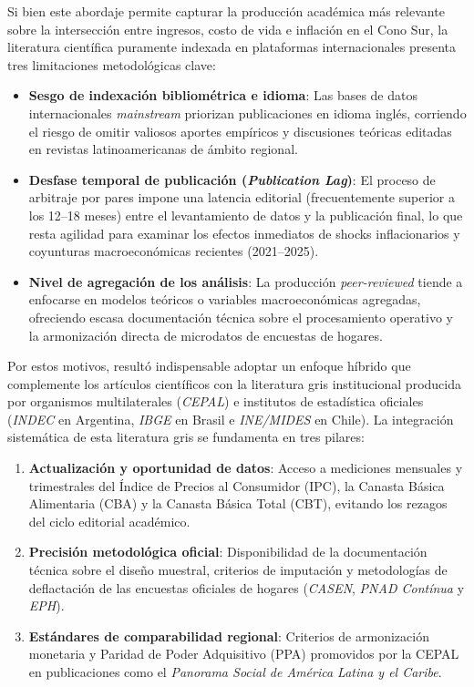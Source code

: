 Si bien este abordaje permite capturar la producción académica más relevante sobre la intersección entre ingresos, costo de vida e inflación en el Cono Sur, la literatura científica puramente indexada en plataformas internacionales presenta tres limitaciones metodológicas clave:

\begin{itemize}
    \item \textbf{Sesgo de indexación bibliométrica e idioma}: Las bases de datos internacionales \textit{mainstream} priorizan publicaciones en idioma inglés, corriendo el riesgo de omitir valiosos aportes empíricos y discusiones teóricas editadas en revistas latinoamericanas de ámbito regional.
    \item \textbf{Desfase temporal de publicación (\textit{Publication Lag})}: El proceso de arbitraje por pares impone una latencia editorial (frecuentemente superior a los 12--18 meses) entre el levantamiento de datos y la publicación final, lo que resta agilidad para examinar los efectos inmediatos de shocks inflacionarios y coyunturas macroeconómicas recientes (2021--2025).
    \item \textbf{Nivel de agregación de los análisis}: La producción \textit{peer-reviewed} tiende a enfocarse en modelos teóricos o variables macroeconómicas agregadas, ofreciendo escasa documentación técnica sobre el procesamiento operativo y la armonización directa de microdatos de encuestas de hogares.
\end{itemize}

Por estos motivos, resultó indispensable adoptar un enfoque híbrido que complemente los artículos científicos con la literatura gris institucional producida por organismos multilaterales (\textit{CEPAL}) e institutos de estadística oficiales (\textit{INDEC} en Argentina, \textit{IBGE} en Brasil e \textit{INE/MIDES} en Chile). La integración sistemática de esta literatura gris se fundamenta en tres pilares:

\begin{enumerate}
    \item \textbf{Actualización y oportunidad de datos}: Acceso a mediciones mensuales y trimestrales del Índice de Precios al Consumidor (IPC), la Canasta Básica Alimentaria (CBA) y la Canasta Básica Total (CBT), evitando los rezagos del ciclo editorial académico.
    \item \textbf{Precisión metodológica oficial}: Disponibilidad de la documentación técnica sobre el diseño muestral, criterios de imputación y metodologías de deflactación de las encuestas oficiales de hogares (\textit{CASEN}, \textit{PNAD Contínua} y \textit{EPH}).
    \item \textbf{Estándares de comparabilidad regional}: Criterios de armonización monetaria y Paridad de Poder Adquisitivo (PPA) promovidos por la CEPAL en publicaciones como el \textit{Panorama Social de América Latina y el Caribe}.
\end{enumerate}

